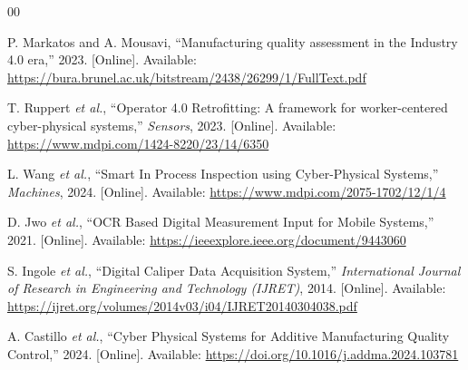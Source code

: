 \documentclass[conference]{IEEEtran}
\begin{document}

\begin{thebibliography}{00}

P. Markatos and A. Mousavi, ``Manufacturing quality assessment in the Industry 4.0 era,'' 2023. [Online]. Available: \url{https://bura.brunel.ac.uk/bitstream/2438/26299/1/FullText.pdf}

T. Ruppert \textit{et al.}, ``Operator 4.0 Retrofitting: A framework for worker-centered cyber-physical systems,'' \textit{Sensors}, 2023. [Online]. Available: \url{https://www.mdpi.com/1424-8220/23/14/6350}

L. Wang \textit{et al.}, ``Smart In Process Inspection using Cyber-Physical Systems,'' \textit{Machines}, 2024. [Online]. Available: \url{https://www.mdpi.com/2075-1702/12/1/4}

D. Jwo \textit{et al.}, ``OCR Based Digital Measurement Input for Mobile Systems,'' 2021. [Online]. Available: \url{https://ieeexplore.ieee.org/document/9443060}

S. Ingole \textit{et al.}, ``Digital Caliper Data Acquisition System,'' \textit{International Journal of Research in Engineering and Technology (IJRET)}, 2014. [Online]. Available: \url{https://ijret.org/volumes/2014v03/i04/IJRET20140304038.pdf}

A. Castillo \textit{et al.}, ``Cyber Physical Systems for Additive Manufacturing Quality Control,'' 2024. [Online]. Available: \url{https://doi.org/10.1016/j.addma.2024.103781}

\end{thebibliography}
\end{document}

